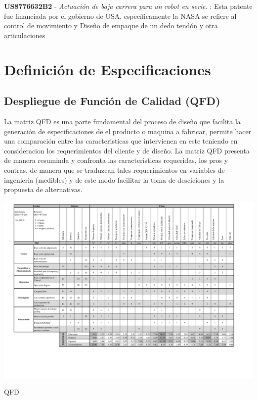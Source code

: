 \textbf{US8776632B2} - \textit{Actuación de baja carrera para un robot en serie.} \citep{patent:US8776632B2}: Esta patente fue financiada por el gobierno de USA, específicamente la NASA se refiere al control de movimiento y Diseño de empaque de un dedo tendón y otra articulaciones


\newpage

\section{Definición de Especificaciones}
\subsection{Despliegue de Función de Calidad (QFD)}

La matriz QFD es una parte fundamental del proceso de diseño que facilita la generación de especificaciones de el producto o maquina a fabricar, permite hacer una comparación entre las caracteristicas que intervienen en este teniendo en consideracion los requerimientos del cliente y de diseño. La matriz QFD presenta de manera resuminda y confronta las caracteristicas requeridas, los pros y contras, de manera que se traduzcan tales requerimientos en variables de ingenieria (medibles) y de este modo facilitar la toma de desciciones y la propuesta de alternativas.

\begin{landscape}
\begin{table}
    \centering
    \includegraphics[scale=0.9]{Cap2_DisenoEspecificaciones/Figura/QFD.pdf}
    \caption{QFD}
    \label{fig:QFD}
\end{table}
\end{landscape}

